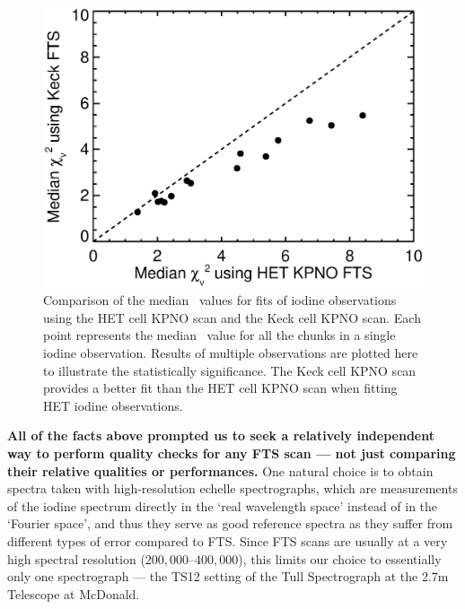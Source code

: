 \begin{figure}[!th]
\centering
\includegraphics[angle=0.,scale=0.38]{het/chisq_comparison.eps}
\caption{Comparison of the median \chisq\ values for fits of iodine
  observations using the HET cell KPNO scan and the Keck cell KPNO
  scan. Each point represents the median \chisq\ value for all the
  chunks in a single iodine observation. Results of multiple
  observations are plotted here to illustrate the statistically
  significance. The Keck cell KPNO scan provides a better fit than the
  HET cell KPNO scan when fitting HET iodine observations.
  \label{fig:chisq_old_keck}}
\end{figure}

\textbf{All of the facts above prompted us to seek a relatively
  independent way to perform quality checks for any FTS scan --- not
  just comparing their relative qualities or performances.} One
natural choice is to obtain spectra taken with high-resolution echelle
spectrographs, which are measurements of the iodine spectrum directly
in the `real wavelength space' instead of in the `Fourier space', and
thus they serve as good reference spectra as they suffer from
different types of error compared to FTS. Since FTS scans are usually
at a very high spectral resolution ($200,000$--$400,000$), this limits
our choice to essentially only one spectrograph --- the TS12 setting
of the Tull Spectrograph at the 2.7m Telescope at McDonald.


